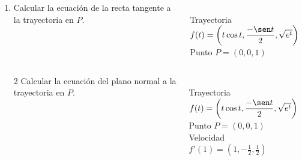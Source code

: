 \documentclass[aspectratio=149,10pt,xcolor=dvipsnames,t]{beamer}
\begin{document}
\begin{frame}
\begin{columns}
\begin{column}[T]{0.65\textwidth}
\begin{enumerate}
\item Calcular la ecuación de la recta tangente a la trayectoria en $P$.
\end{enumerate}
\end{column}
\begin{column}[T]{0.35\textwidth}
\\
Trayectoria $f(t)=\left(t\cos t, \dfrac{-\sen t}{2}, \sqrt{e^t}\right)$\\
Punto $P=(0,0,1)$
\end{column}
\end{columns}
\end{frame}


\begin{frame}
\begin{columns}
\begin{column}[T]{0.65\textwidth}
\begin{enumerate}
\item[2] Calcular la ecuación del plano normal a la trayectoria en $P$.
\end{enumerate}
\end{column}
\begin{column}[T]{0.35\textwidth}
\\
Trayectoria $f(t)=\left(t\cos t, \dfrac{-\sen t}{2}, \sqrt{e^t}\right)$\\
Punto $P=(0,0,1)$\\
Velocidad $f'(1)=\left(1,-\frac{1}{2},\frac{1}{2}\right)$
\end{column}
\end{columns}
\end{frame}
\end{document}
